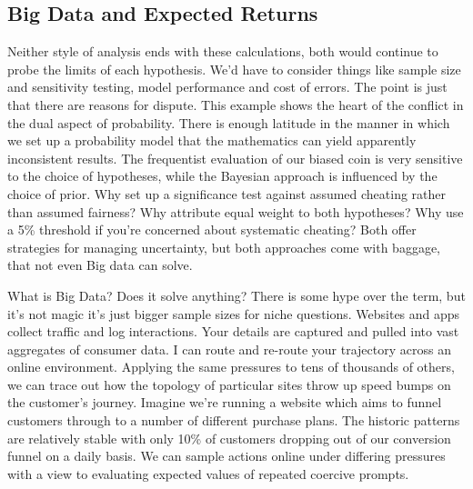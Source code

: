 \documentclass[10pt,a4paper,notitlepage, twocolumn]{article}
\begin{document}
\raggedbottom

\subsection*{Big Data and Expected Returns}
Neither style of analysis ends with these calculations, both would continue to probe the limits of each hypothesis. We'd have to consider things like sample size and sensitivity testing, model performance and cost of errors. The point is just that there are reasons for dispute. This example shows the heart of the conflict in the dual aspect of probability. There is enough latitude in the manner in which we set up a probability model that the mathematics can yield apparently inconsistent results. The frequentist evaluation of our biased coin is very sensitive to the choice of hypotheses, while the Bayesian approach is influenced by the choice of prior. Why set up a significance test against assumed cheating rather than assumed fairness? Why attribute equal weight to both hypotheses? Why use a 5\% threshold if you're concerned about systematic cheating? Both offer strategies for managing uncertainty, but both approaches come with baggage, that not even Big data can solve.
\newline 

\noindent What is Big Data? Does it solve anything? There is some hype over the term, but it's not magic it's just bigger sample sizes for niche questions. Websites and apps collect traffic and log interactions. Your details are captured and pulled into vast aggregates of consumer data. I can route and re-route your trajectory across an online environment. Applying the same pressures to tens of thousands of others, we can trace out how the topology of particular sites throw up speed bumps on the customer's journey. 
Imagine we're running a website which aims to funnel customers through to a number of different purchase plans. The historic patterns are relatively stable with only 10\% of customers dropping out of our conversion funnel on a daily basis. We can sample actions online under differing pressures with a view to evaluating expected values of repeated coercive prompts.
\end{document}
